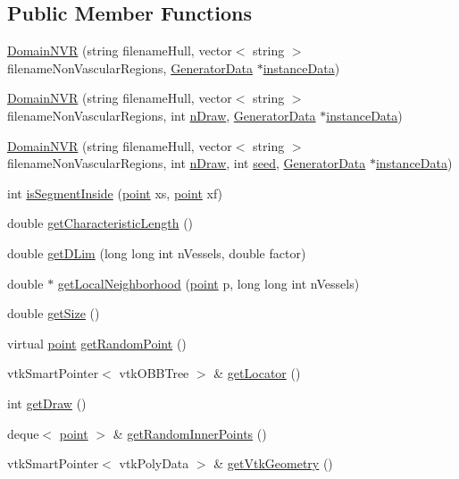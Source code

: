 \subsection*{Public Member Functions}
\begin{DoxyCompactItemize}
\item 
\hyperlink{class_domain_n_v_r_a431e9b827836f231d6acc002332eb6a1}{Domain\+N\+VR} (string filename\+Hull, vector$<$ string $>$ filename\+Non\+Vascular\+Regions, \hyperlink{class_generator_data}{Generator\+Data} $\ast$\hyperlink{class_abstract_domain_aa37fbabc2bfa92c574f7db7544016b53}{instance\+Data})
\item 
\hyperlink{class_domain_n_v_r_af24a5b01a05b7e07c7cb0ba401dbb209}{Domain\+N\+VR} (string filename\+Hull, vector$<$ string $>$ filename\+Non\+Vascular\+Regions, int \hyperlink{class_domain_n_v_r_aa8a3d85f1a554c27e0ca399924576822}{n\+Draw}, \hyperlink{class_generator_data}{Generator\+Data} $\ast$\hyperlink{class_abstract_domain_aa37fbabc2bfa92c574f7db7544016b53}{instance\+Data})
\item 
\hyperlink{class_domain_n_v_r_abf32bdc762f1baacd89e14daf3e65bd7}{Domain\+N\+VR} (string filename\+Hull, vector$<$ string $>$ filename\+Non\+Vascular\+Regions, int \hyperlink{class_domain_n_v_r_aa8a3d85f1a554c27e0ca399924576822}{n\+Draw}, int \hyperlink{class_domain_n_v_r_aaf470f5f729cb3fc68d5449c52eccde5}{seed}, \hyperlink{class_generator_data}{Generator\+Data} $\ast$\hyperlink{class_abstract_domain_aa37fbabc2bfa92c574f7db7544016b53}{instance\+Data})
\item 
int \hyperlink{class_domain_n_v_r_a46b7a56ffdb8f8e0cfcd2a5761571394}{is\+Segment\+Inside} (\hyperlink{structpoint}{point} xs, \hyperlink{structpoint}{point} xf)
\item 
double \hyperlink{class_domain_n_v_r_a590ea752ce83767038de90138faf8a21}{get\+Characteristic\+Length} ()
\item 
double \hyperlink{class_domain_n_v_r_a5e67e5367a9f22ab0243e06d92abccab}{get\+D\+Lim} (long long int n\+Vessels, double factor)
\item 
double $\ast$ \hyperlink{class_domain_n_v_r_a5d97b6894250d8034c5e0679266f9fb1}{get\+Local\+Neighborhood} (\hyperlink{structpoint}{point} p, long long int n\+Vessels)
\item 
double \hyperlink{class_domain_n_v_r_aae7b6782c1caab8cf5246c802be410cc}{get\+Size} ()
\item 
virtual \hyperlink{structpoint}{point} \hyperlink{class_domain_n_v_r_a88c76433bc3e8a1c1d60d4e7643f46d0}{get\+Random\+Point} ()
\item 
vtk\+Smart\+Pointer$<$ vtk\+O\+B\+B\+Tree $>$ \& \hyperlink{class_domain_n_v_r_a504fa4fb67064bdf3b1507a1d7372d41}{get\+Locator} ()
\item 
int \hyperlink{class_domain_n_v_r_a3fead46c8720529bc3faaae5b817ccb7}{get\+Draw} ()
\item 
deque$<$ \hyperlink{structpoint}{point} $>$ \& \hyperlink{class_domain_n_v_r_a2b303bccf9a1db72e3bae866d7947f2d}{get\+Random\+Inner\+Points} ()
\item 
vtk\+Smart\+Pointer$<$ vtk\+Poly\+Data $>$ \& \hyperlink{class_domain_n_v_r_a50591c2d4b9e055821cc53416bf4263c}{get\+Vtk\+Geometry} ()
\end{DoxyCompactItemize}
